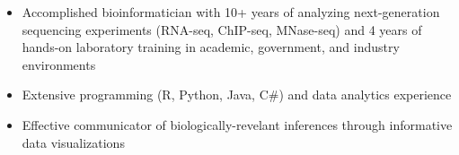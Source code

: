 

\begin{resentries}

\vspace{-2mm}

\begin{itemize}[leftmargin=*]
	\setlength{\itemsep}{-1.5mm}
	\item{Accomplished bioinformatician with 10+ years of analyzing next-generation sequencing experiments (RNA-seq, ChIP-seq, MNase-seq) and 4 years of hands-on laboratory training in academic, government, and industry environments}
	\item{Extensive programming (R, Python, Java, C\#) and data analytics experience}
	\item{Effective communicator of biologically-revelant inferences through informative data visualizations}

\end{itemize}

\end{resentries}
